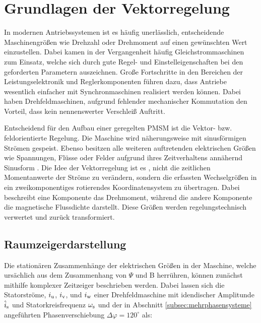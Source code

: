 

\chapter{Grundlagen der Vektorregelung}
\label{cha:Grundlagen der Vektorregelung}

In modernen Antriebssystemen ist es häufig unerlässlich, entscheidende Maschinengrößen wie Drehzahl oder Drehmoment auf einen gewünschten Wert einzustellen.
Dabei kamen in der Vergangenheit häufig Gleichstrommaschinen zum Einsatz, welche sich durch gute Regel- und Einstelleigenschaften bei den geforderten Parametern auszeichnen.
Große Fortschritte in den Bereichen der Leistungselektronik und Reglerkomponenten führen dazu, dass Antriebe wesentlich einfacher mit Synchronmaschinen realisiert werden können.
Dabei haben Drehfeldmaschinen, aufgrund fehlender mechanischer Kommutation den Vorteil, dass kein nennenswerter Verschleiß Auftritt.

Entscheidend für den Aufbau einer geregelten PMSM ist die Vektor- bzw. feldorientierte Regelung. 
Die Maschine wird näherungsweise mit sinusförmigen Strömen gespeist. 
Ebenso besitzen alle weiteren auftretenden elektrischen Größen wie Spannungen, Flüsse oder Felder aufgrund ihres Zeitverhaltens annähernd Sinusform \parencite{nuss2010}.	
Die Idee der Vektorregelung ist es , nicht die zeitlichen Momentanwerte der Ströme zu verändern, sondern die erfassten Wechselgrößen in ein zweikomponentiges rotierendes Koordinatensystem zu übertragen.
Dabei beschreibt eine Komponente das Drehmoment, während die andere Komponente die magnetische Flussdichte darstellt.
Diese Größen werden regelungstechnisch verwertet und zurück transformiert.

\section{Raumzeigerdarstellung}
\label{sec:raumzeiger}

Die stationären Zusammenhänge der elektrischen Größen in der Maschine, welche ursächlich aus dem Zusammenhang von $\Psi$ und B herrühren, können zunächst mithilfe komplexer Zeitzeiger beschrieben werden. Dabei lassen sich die Statorströme, $i_{\mathrm{u}}$, $i_{\mathrm{v}}$, und $i_{\mathrm{w}}$ einer Drehfeldmaschine mit idendischer Amplitunde $\hat i_{\mathrm{s}}$ und Statorkreisfrequenz $\omega_{\mathrm{s}}$  und der in Abschnitt \ref{subsec:mehrphasensysteme} angeführten Phasenverschiebung $\Delta \varphi = 120^{\circ}$ als:


